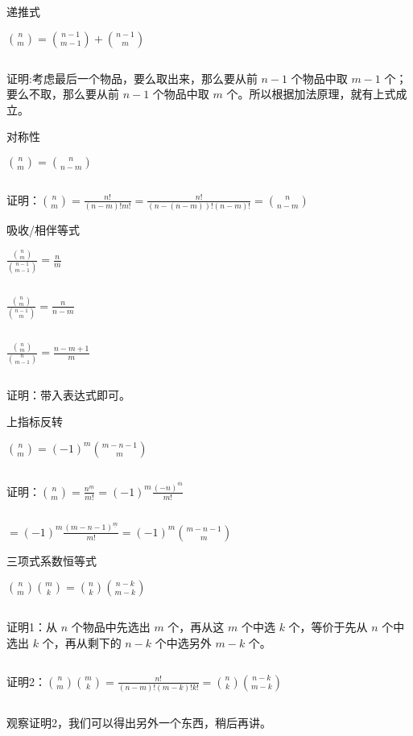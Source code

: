 \documentclass{beamer}
\begin{document}
\begin{frame}{递推式}

    $\binom n m = \binom {n-1} {m-1} + \binom {n-1} m$
    
    $ $
    \pause
    
    证明:考虑最后一个物品，要么取出来，那么要从前 $n-1$ 个物品中取 $m-1$ 个；要么不取，那么要从前 $n-1$ 个物品中取 $m$ 个。所以根据加法原理，就有上式成立。
    
\end{frame}

\begin{frame}{对称性}

    $\binom n m = \binom n {n-m}$

    $ $
    \pause 

    证明：$\binom n m = \frac{n!}{(n-m)!m!} = \frac {n!}{(n-(n-m))!(n-m)!}=\binom n {n-m}$
    
\end{frame}

\begin{frame}{吸收/相伴等式}

    $\frac{\binom n m}{\binom {n-1}{m-1}} = \frac n m$

    $ $
    
    $\frac{\binom n m}{\binom {n-1}{m}} = \frac n {n - m}$

    $ $
    
    $\frac{\binom n m}{\binom {n}{m-1}} = \frac {n - m + 1} m$

    $ $
    \pause

    证明：带入表达式即可。
    
\end{frame}

\begin{frame}{上指标反转}

    $\binom n m = (-1)^m\binom {m-n-1}{m}$

    $ $
    \pause

    证明：$\binom nm = \frac {n^{\underline m}}{m!} = (-1)^m\frac{(-n)^{\overline m}}{m!}$

    $ $
    
    $=(-1)^m\frac{(m-n-1)^{\underline m}}{m!} = (-1) ^ m \binom {m - n - 1} m$
    
\end{frame}

\begin{frame}{三项式系数恒等式}

    $\binom n m \binom m k = \binom n k \binom {n - k} {m - k}$

    $ $
    \pause

    证明1：从 $n$ 个物品中先选出 $m$ 个，再从这 $m$ 个中选 $k$ 个，等价于先从 $n$ 个中选出 $k$ 个，再从剩下的 $n - k$ 个中选另外 $m - k$ 个。

    $ $
    \pause

    证明2：$\binom n m \binom m k = \frac {n!} {(n - m)!(m - k)! k!} = \binom n k \binom {n - k}{m - k}$

    $ $
    \pause 
    
    观察证明2，我们可以得出另外一个东西，稍后再讲。
    
\end{frame}
\end{document}
